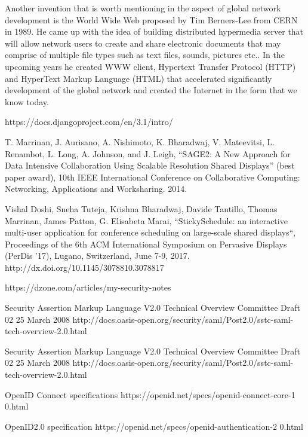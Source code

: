 \documentclass[magisterska,en]{pracamgr}
\begin{document}
Another invention that is worth mentioning in the aspect of global network development is the World Wide Web proposed by Tim Berners-Lee from CERN in 1989. He came up with the idea of building distributed hypermedia server that will allow network users to create and share electronic documents that may comprise of multiple file types such as text files, sounds, pictures etc.. In the upcoming years he created WWW client, Hypertext Transfer Protocol (HTTP) and HyperText Markup Language (HTML) that accelerated significantly development of the global network and created the Internet in the form that we know today.\cite{Internet_History_article} 



\begin{thebibliography}{9}

  https://docs.djangoproject.com/en/3.1/intro/
  
  T. Marrinan, J. Aurisano, A. Nishimoto, K. Bharadwaj, V. Mateevitsi, L. Renambot, L. Long, A. Johnson, and J. Leigh, “SAGE2: A New Approach for Data Intensive Collaboration Using Scalable Resolution Shared Displays” (best paper award), 10th IEEE International Conference on Collaborative Computing: Networking, Applications and Worksharing. 2014.
  
  Vishal Doshi, Sneha Tuteja, Krishna Bharadwaj, Davide Tantillo, Thomas Marrinan, James Patton, G. Elisabeta Marai, “StickySchedule: an interactive multi-user application for conference scheduling on large-scale shared displays“, Proceedings of the 6th ACM International Symposium on Pervasive Displays (PerDis ’17), Lugano, Switzerland, June 7-9, 2017. http://dx.doi.org/10.1145/3078810.3078817
  
  
  https://dzone.com/articles/my-security-notes
  
 Security Assertion Markup Language V2.0 Technical Overview
 Committee Draft 02
 25 March 2008
 http://docs.oasis-open.org/security/saml/Post2.0/sstc-saml-tech-overview-2.0.html
 
 Security Assertion Markup Language V2.0 Technical Overview
 Committee Draft 02
 25 March 2008
 http://docs.oasis-open.org/security/saml/Post2.0/sstc-saml-tech-overview-2.0.html
 
 
 OpenID Connect specifications
 https://openid.net/specs/openid-connect-core-1 0.html
 
OpenID2.0 specification
https://openid.net/specs/openid-authentication-2 0.html
 

\end{thebibliography}
\end{document}
